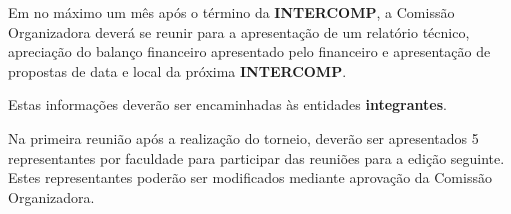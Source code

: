 \begin{article}
	Em no máximo um mês após o término da \textbf{INTERCOMP}, a Comissão Organizadora deverá se reunir para a apresentação de um relatório técnico, apreciação do balanço financeiro apresentado pelo financeiro e apresentação de propostas de data e local da próxima \textbf{INTERCOMP}.

	\begin{xparagraph}
		Estas informações deverão ser encaminhadas às entidades \textbf{integrantes}.
	\end{xparagraph}

	\begin{xparagraph}
		Na primeira reunião após a realização do torneio, deverão ser apresentados 5 representantes por faculdade para participar das reuniões para a edição seguinte. Estes representantes poderão ser modificados mediante aprovação da Comissão Organizadora.
	\end{xparagraph}
\end{article}
